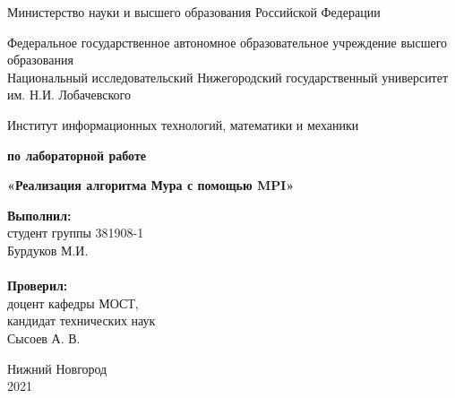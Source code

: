 \documentclass{report}
\begin{document}
\begin{titlepage}

\begin{center}
Министерство науки и высшего образования Российской Федерации
\end{center}

\begin{center}
Федеральное государственное автономное образовательное учреждение высшего образования \\
Национальный исследовательский Нижегородский государственный университет им. Н.И. Лобачевского
\end{center}

\begin{center}
Институт информационных технологий, математики и механики
\end{center}

\vspace{4em}

\begin{center}
\textbf{ по лабораторной работе} \\
\end{center}
\begin{center}
\textbf{\Large«Реализация алгоритма Мура с помощью MPI»} \\
\end{center}

\vspace{4em}

\newbox{\lbox}
\newlength{\maxl}
\setlength{\maxl}{\wd\lbox}
\hfill\parbox{7cm}{
\hspace*{5cm}\hspace*{-5cm}\textbf{Выполнил:} \\ студент группы 381908-1 \\ Бурдуков М.И.\\
\\
\hspace*{5cm}\hspace*{-5cm}\textbf{Проверил:}\\ доцент кафедры МОСТ, \\ кандидат технических наук \\ Сысоев А. В.\\
}
\vspace{\fill}

\begin{center} Нижний Новгород \\ 2021 \end{center}

\end{titlepage}
\end{document}

